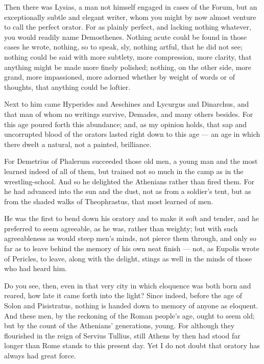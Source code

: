  Then there was Lysias, a man not himself engaged in cases of the Forum, but an exceptionally subtle and elegant writer, whom you might by now almost venture to call the perfect orator. For as plainly perfect, and lacking nothing whatever, you would readily name Demosthenes. Nothing acute could be found in those cases he wrote, nothing, so to speak, sly, nothing artful, that he did not see; nothing could be said with more subtlety, more compression, more clarity, that anything might be made more finely polished; nothing, on the other side, more grand, more impassioned, more adorned whether by weight of words or of thoughts, that anything could be loftier.

 Next to him came Hyperides and Aeschines and Lycurgus and Dinarchus, and that man of whom no writings survive, Demades, and many others besides. For this age poured forth this abundance; and, as my opinion holds, that sap and uncorrupted blood of the orators lasted right down to this age — an age in which there dwelt a natural, not a painted, brilliance.

 For Demetrius of Phalerum succeeded those old men, a young man and the most learned indeed of all of them, but trained not so much in the camp as in the wrestling-school. And so he delighted the Athenians rather than fired them. For he had advanced into the sun and the dust, not as from a soldier's tent, but as from the shaded walks of Theophrastus, that most learned of men.

 He was the first to bend down his oratory and to make it soft and tender, and he preferred to seem agreeable, as he was, rather than weighty; but with such agreeableness as would steep men's minds, not pierce them through, and only so far as to leave behind the memory of his own neat finish — not, as Eupolis wrote of Pericles, to leave, along with the delight, stings as well in the minds of those who had heard him.

 Do you see, then, even in that very city in which eloquence was both born and reared, how late it came forth into the light? Since indeed, before the age of Solon and Pisistratus, nothing is handed down to memory of anyone as eloquent. And these men, by the reckoning of the Roman people's age, ought to seem old; but by the count of the Athenians' generations, young. For although they flourished in the reign of Servius Tullius, still Athens by then had stood far longer than Rome stands to this present day. Yet I do not doubt that oratory has always had great force.

